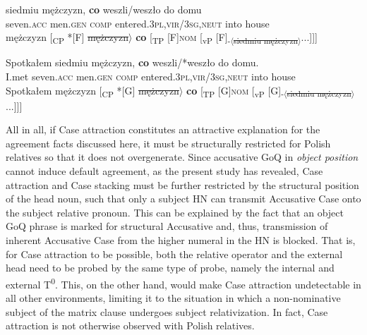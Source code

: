 \documentclass[output=paper]{langsci/langscibook}
\begin{document}
\ea%
    \label{ex:leska:33}
    \gll siedmiu   mężczyzn,   \textbf{co}   weszli/weszło     do   domu\\
         seven.\textsc{acc}   men.\textsc{gen}   \textsc{comp}   entered.\textsc{3pl,vir}/\textsc{3sg,neut} into   house \\
    \glt {} mężczyzn [\textsubscript{CP} *[F]\sout{ mężczyzn}$\rangle$ \textbf{co} [\textsubscript{TP} [F]{\footnotesize\textsc{nom}} [\textsubscript{vP} [F]\textsubscript{-$\langle$\sout{siedmiu mężczyzn}$\rangle$}...]]]
\z

\ea%
    \label{ex:leska:34}
    \gll Spotkałem   siedmiu   mężczyzn,   \textbf{co}   weszli/*weszło do   domu.\\
         I.met     seven.\textsc{acc}   men.\textsc{gen}   \textsc{comp} entered.\textsc{3pl,vir}/\textsc{3sg,neut} into   house\\
    \glt Spotkałem  mężczyzn [\textsubscript{CP} *[G]\sout{ mężczyzn}$\rangle$ \textbf{co} [\textsubscript{TP} [G]{\footnotesize\textsc{nom}} [\textsubscript{vP} [G]\textsubscript{-$\langle$\sout{siedmiu mężczyzn}$\rangle$}...]]]
\z


All in all, if Case attraction constitutes an attractive explanation for the agreement facts discussed here, it must be structurally restricted for Polish relatives so that it does not overgenerate. Since accusative GoQ in \textit{object position} cannot induce default agreement, as the present study has revealed, Case attraction and Case stacking must be further restricted by the structural position of the head noun, such that only a subject HN can transmit Accusative Case onto the subject relative pronoun. This can be explained by the fact that an object GoQ phrase is marked for structural Accusative and, thus, transmission of inherent Accusative Case from the higher numeral in the HN is blocked. That is, for Case attraction to be possible, both the relative operator and the external head need to be probed by the same type of probe, namely the internal and external T\textsuperscript{0}. This, on the other hand, would make Case attraction undetectable in all other environments, limiting it to the situation in which a non-nominative subject of the matrix clause undergoes subject relativization. In fact, Case attraction is not otherwise observed with Polish relatives. 
\end{document}
